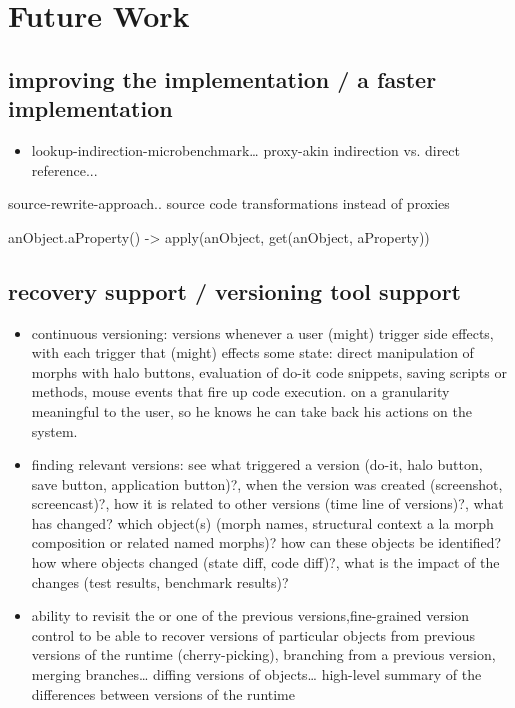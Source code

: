 \section{Future Work} \label{sec:FUTURE_WORK}

\subsection{improving the implementation / a faster implementation}

\begin{itemize}
    \item lookup-indirection-microbenchmark… proxy-akin indirection vs. direct reference...
\end{itemize}

source-rewrite-approach.. source code transformations instead of proxies

anObject.aProperty() -> apply(anObject, get(anObject, aProperty))

\subsection{recovery support / versioning tool support}

\begin{itemize}
    \item continuous versioning: versions whenever a user (might) trigger side effects, with each trigger that (might) effects some state: direct manipulation of morphs with halo buttons, evaluation of do-it code snippets, saving scripts or methods, mouse events that fire up code execution.
on a granularity meaningful to the user, so he knows he can take back his actions on the system.
    \item finding relevant versions: see what triggered a version (do-it, halo button, save button, application button)?, when the version was created (screenshot, screencast)?, how it is related to other versions (time line of versions)?, what has changed? which object(s) (morph names, structural context a la morph composition or related named morphs)? how can these objects be identified? how where objects changed (state diff, code diff)?, what is the impact of the changes (test results, benchmark results)?
    \item ability to revisit the or one of the previous versions,fine-grained version control to be able to recover versions of particular objects from previous versions of the runtime (cherry-picking), branching from a previous version, merging branches… diffing versions of objects… high-level summary of the differences between versions of the runtime
\end{itemize}
